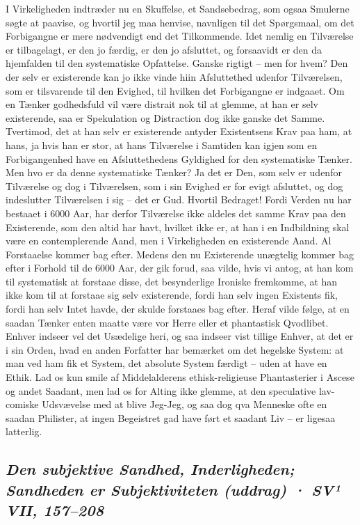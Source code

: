 \documentclass[12pt,a4paper]{article}
\newcommand{\sectionheading}[1]{\subsection*{\normalfont\itshape #1}}
\begin{document}
I Virkeligheden indtræder nu en Skuffelse, et Sandsebedrag, som ogsaa Smulerne søgte at paavise, og hvortil jeg maa henvise, navnligen til det Spørgsmaal, om det Forbigangne er mere nødvendigt end det Tilkommende. Idet nemlig en Tilværelse er tilbagelagt, er den jo færdig, er den jo afsluttet, og forsaavidt er den da hjemfalden til den systematiske Opfattelse. Ganske rigtigt – men for hvem? Den der selv er existerende kan jo ikke vinde hiin Afsluttethed udenfor Tilværelsen, som er tilsvarende til den Evighed, til hvilken det Forbigangne er indgaaet. Om en Tænker godhedsfuld vil være distrait nok til at glemme, at han er selv existerende, saa er Spekulation og Distraction dog ikke ganske det Samme. Tvertimod, det at han selv er existerende antyder Existentsens Krav paa ham, at hans, ja hvis han er stor, at hans Tilværelse i Samtiden kan igjen som en Forbigangenhed have en Afsluttethedens Gyldighed for den systematiske Tænker. Men hvo er da denne systematiske Tænker? Ja det er Den, som selv er udenfor Tilværelse og dog i Tilværelsen, som i sin Evighed er for evigt afsluttet, og dog indeslutter Tilværelsen i sig – det er Gud. Hvortil Bedraget! Fordi Verden nu har bestaaet i 6000 Aar, har derfor Tilværelse ikke aldeles det samme Krav paa den Existerende, som den altid har havt, hvilket ikke er, at han i en Indbildning skal være en contemplerende Aand, men i Virkeligheden en existerende Aand. Al Forstaaelse kommer bag efter. Medens den nu Existerende unægtelig kommer bag efter i Forhold til de 6000 Aar, der gik forud, saa vilde, hvis vi antog, at han kom til systematisk at forstaae disse, det besynderlige Ironiske fremkomme, at han ikke kom til at forstaae sig selv existerende, fordi han selv ingen Existents fik, fordi han selv Intet havde, der skulde forstaaes bag efter. Heraf vilde følge, at en saadan Tænker enten maatte være vor Herre eller et phantastisk Qvodlibet. Enhver indseer vel det Usædelige heri, og saa indseer vist tillige Enhver, at det er i sin Orden, hvad en anden Forfatter har bemærket om det hegelske System: at man ved ham fik et System, det absolute System færdigt – uden at have en Ethik. Lad os kun smile af Middelalderens ethisk-religieuse Phantasterier i Ascese og andet Saadant, men lad os for Alting ikke glemme, at den speculative lav-comiske Udsvævelse med at blive Jeg-Jeg, og saa dog qva Menneske ofte en saadan Philister, at ingen Begeistret gad have ført et saadant Liv – er ligesaa latterlig.

\sectionheading{Den subjektive Sandhed, Inderligheden; Sandheden er Subjektiviteten (uddrag)  ·  SV¹ VII, 157–208}
\end{document}
